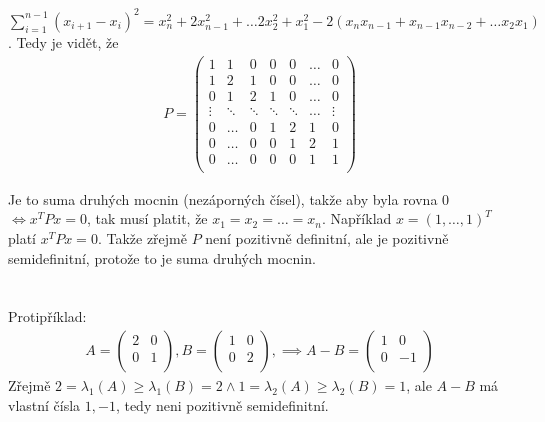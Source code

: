 \documentclass[12pt, a4paper]{article}
\begin{document}
\subsection{}
$\sum_{i=1}^{n-1} (x_{i+1}-x_{i})^2 = x^2_n + 2x^2_{n-1} + \dots 2x^2_2 + x^2_1 -2(x_nx_{n-1} + x_{n-1}x_{n-2} + \dots x_2x_1)$. Tedy je vidět, že
\begin{gather*}
P = \begin{pmatrix}
1 & 1 & 0 & 0 & 0 & \dots & 0\\
1 & 2 & 1 & 0 & 0 & \dots & 0\\
0 & 1 & 2 & 1 & 0 & \dots & 0\\
\vdots & \ddots & \ddots & \ddots & \ddots & \dots & \vdots\\
0 & \dots & 0 & 1 & 2 & 1 & 0\\
0 & \dots & 0 & 0 & 1 & 2 & 1\\
0 & \dots & 0 & 0 & 0 & 1 & 1\\
\end{pmatrix}
\end{gather*}

Je to suma druhých mocnin (nezáporných čísel), takže aby byla rovna 0 $ \iff x^TPx=0$, tak musí platit, že $x_1 = x_2 = \dots = x_n$. Například $x = (1, \dots, 1)^T$ platí $x^TPx = 0$. Takže zřejmě $P$ není pozitivně definitní, ale je pozitivně semidefinitní, protože to je suma druhých mocnin.

\section{}
\subsection{}
Protipříklad:
\begin{gather*}
A = \begin{pmatrix}
2 & 0\\
0 & 1\\
\end{pmatrix},
B = \begin{pmatrix}
1 & 0\\
0 & 2\\
\end{pmatrix},
\implies A-B = \begin{pmatrix}
1 & 0\\
0 & -1\\
\end{pmatrix}
\end{gather*}
Zřejmě $2 = \lambda_1(A)\geq \lambda_1(B) = 2 \land 1 = \lambda_2(A)\geq \lambda_2(B) = 1$, ale $A-B$ má vlastní čísla $1,-1$, tedy neni pozitivně semidefinitní.
\end{document}
